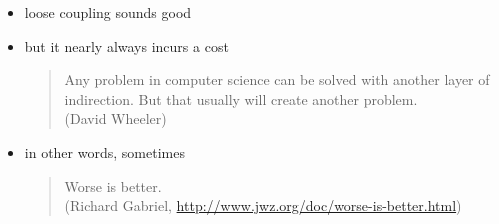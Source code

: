 \documentclass{sepslide-soa-faked} %
\begin{document}
\begin{slide}
\begin{itemize}
\item loose coupling sounds good
\item but it nearly always incurs a cost
\begin{quote}
{\sffamily
Any problem in computer science can be solved with another layer of indirection. But that usually will create another problem.
} \medskip \\
(David Wheeler)
\end{quote}
\item in other words, sometimes 
\begin{quote}
{\sffamily
Worse is better.
} \medskip \\
(Richard Gabriel, \url{http://www.jwz.org/doc/worse-is-better.html})
\end{quote}
\end{itemize}
\end{slide}

\begin{slide}
  \Listofslides
\end{slide}

\begin{slide}
  \Timetable
\end{slide}
\end{document}
